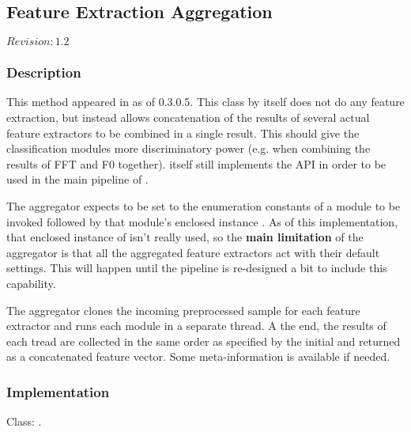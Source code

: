 \subsection{Feature Extraction Aggregation}
\label{sect:aggregator}

$Revision: 1.2 $

\subsubsection{Description}

This method appeared in {\marf} as of 0.3.0.5.
This class by itself does not do any feature extraction, but
instead allows concatenation of the results of several actual feature
extractors to be combined in a single result. This should give the
classification modules more discriminatory power (e.g. when combining
the results of FFT and F0 together).
 itself still implements
the  API in order to be used in the main
pipeline of .

The aggregator expects  to be set to the
enumeration constants of a module to be invoked followed by that module's
enclosed instance . As of this implementation,
that enclosed instance of  isn't really used, so
the {\bf main limitation} of the aggregator is that all the aggregated
feature extractors act with their default settings. This will happen until
the pipeline is re-designed a bit to include this capability.

The aggregator clones the incoming preprocessed sample for each
feature extractor and runs each module in a separate thread. A the
end, the results of each tread are collected in the same order as
specified by the initial  and returned
as a concatenated feature vector. Some meta-information is available
if needed.

\subsubsection{Implementation}

Class: .

